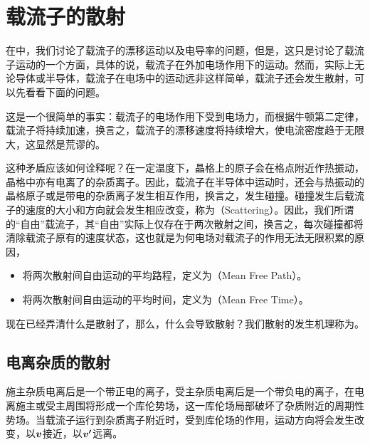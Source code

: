 \section{载流子的散射}
在中，我们讨论了载流子的漂移运动以及电导率的问题，但是，这只是讨论了载流子运动的一个方面，具体的说，载流子在外加电场作用下的运动。然而，实际上无论导体或半导体，载流子在电场中的运动远非这样简单，载流子还会发生散射，可以先看看下面的问题。

这是一个很简单的事实：载流子的电场作用下受到电场力，而根据牛顿第二定律，载流子将持续加速，换言之，载流子的漂移速度将持续增大，使电流密度趋于无限大，这显然是荒谬的。

这种矛盾应该如何诠释呢？在一定温度下，晶格上的原子会在格点附近作热振动，晶格中亦有电离了的杂质离子。因此，载流子在半导体中运动时，还会与热振动的晶格原子或是带电的杂质离子发生相互作用，换言之，发生碰撞。碰撞发生后载流子的速度的大小和方向就会发生相应改变，称为（Scattering）。因此，我们所谓的“自由”载流子，其“自由”实际上仅存在于两次散射之间，换言之，每次碰撞都将清除载流子原有的速度状态，这也就是为何电场对载流子的作用无法无限积累的原因，
\begin{itemize}
    \item 将两次散射间自由运动的平均路程，定义为（Mean Free Path）。
    \item 将两次散射间自由运动的平均时间，定义为（Mean Free Time）。
\end{itemize}
现在已经弄清什么是散射了，那么，什么会导致散射？我们散射的发生机理称为。

\subsection{电离杂质的散射}
施主杂质电离后是一个带正电的离子，受主杂质电离后是一个带负电的离子，在电离施主或受主周围将形成一个库伦势场，这一库伦场局部破坏了杂质附近的周期性势场。当载流子运行到杂质离子附近时，受到库伦场的作用，运动方向将会发生改变，以$\vb*{v}$接近，以$\vb*{v'}$远离。

